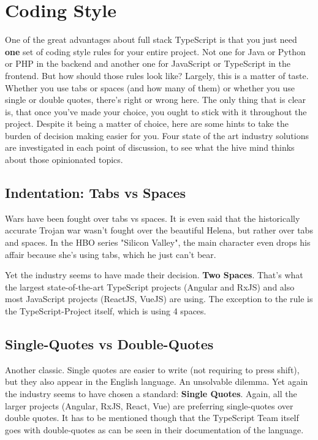\documentclass[12pt,a4paper]{report}
\begin{document}
\section{Coding Style}
One of the great advantages about full stack TypeScript is that you just need \textbf{one} set of coding style rules for your entire project. Not one for Java or Python or PHP in the backend and another one for JavaScript or TypeScript in the frontend. But how should those rules look like? Largely, this is a matter of taste. Whether you use tabs or spaces (and how many of them) or whether you use single or double quotes, there's right or wrong here. The only thing that is clear is, that once you've made your choice, you ought to stick with it throughout the project. Despite it being a matter of choice, here are some hints to take the burden of decision making easier for you. Four state of the art industry solutions are investigated in each point of discussion, to see what the hive mind thinks about those opinionated topics.

\subsection{Indentation: Tabs vs Spaces}
Wars have been fought over tabs vs spaces. It is even said that the historically accurate Trojan war wasn't fought over the beautiful Helena, but rather over tabs and spaces. In the HBO series "Silicon Valley", the main character even drops his affair because she's using tabs, which he just can't bear.

Yet the industry seems to have made their decision. \textbf{Two Spaces}. That's what the largest state-of-the-art TypeScript projects (Angular and RxJS) and also most JavaScript projects (ReactJS, VueJS) are using. The exception to the rule is the TypeScript-Project itself, which is using 4 spaces.

\subsection{Single-Quotes vs Double-Quotes}
Another classic. Single quotes are easier to write (not requiring to press shift), but they also appear in the English language. An unsolvable dilemma. Yet again the industry seems to have chosen a standard: \textbf{Single Quotes}. Again, all the larger projects (Angular, RxJS, React, Vue) are preferring single-quotes over double quotes. It has to be mentioned though that the TypeScript Team itself goes with double-quotes as can be seen in their documentation of the language.
\end{document}
